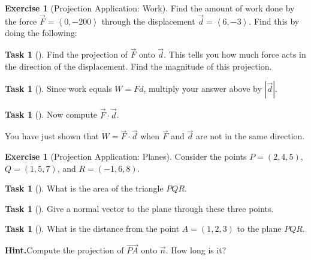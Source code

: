 \documentclass[10pt,]{book}
\theoremstyle{plain}
\theoremstyle{definition}
\theoremstyle{definition}
\theoremstyle{definition}
\theoremstyle{definition}
\newtheorem{exploration}[project]{Exercise}
\newtheorem{task}[project]{Task}
\theoremstyle{definition}
\numberwithin{equation}{section}
\newcommand{\lt}{<}
\begin{document}
\begin{exploration}[Projection Application: Work]\label{first_work_problem}
Find the amount of work done by the force \(\vec F=\left\lt 0,-200\right>\) through the displacement \(\vec d=\left\lt 6,-3\right>\). Find this by doing the following:%
\begin{task}[]\label{task-87}
Find the projection of \(\vec F\) onto \(\vec d\). This tells you how much force acts in the direction of the displacement. Find the magnitude of this projection.%
\end{task}
\begin{task}[]\label{task-88}
Since work equals \(W=Fd\), multiply your answer above by \(|\vec {d}|\).%
\end{task}
\begin{task}[]\label{task-89}
Now compute \(\vec F\cdot \vec d\).%
\end{task}
\bigbreak
You have just shown that \(W=\vec F\cdot \vec d\) when \(\vec F\) and \(\vec d\) are not in the same direction.%
\end{exploration}
\begin{exploration}[Projection Application: Planes]\label{exploration-53}
Consider the points \(P=(2,4,5)\), \(Q=(1,5,7)\), and \(R=(-1,6,8)\).%
\begin{task}[]\label{task-90}
What is the area of the triangle \(PQR\).%
\end{task}
\begin{task}[]\label{task-91}
Give a normal vector to the plane through these three points.%
\end{task}
\begin{task}[]\label{task-92}
What is the distance from the point \(A=(1,2,3)\) to the plane \(PQR\).%
\par\medskip\noindent%
\textbf{Hint.}\quad Compute the projection of \(\vec {PA}\) onto \(\vec n\). How long is it?%
\end{task}
\end{exploration}
\typeout{************************************************}
\typeout{************************************************}
\end{document}
